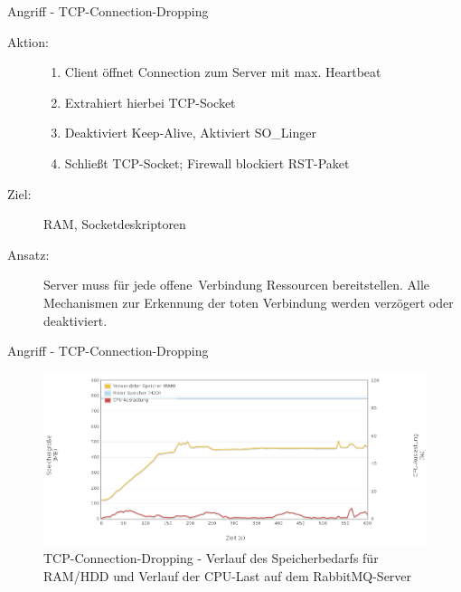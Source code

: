 \documentclass[10pt]{beamer}
\begin{document}
\begin{frame}[t]{Angriff - TCP-Connection-Dropping}
\begin{description}
	\item[Aktion:]
		\begin{enumerate}
			\item Client öffnet Connection zum Server mit max. Heartbeat
			\item Extrahiert hierbei TCP-Socket
			\item Deaktiviert Keep-Alive, Aktiviert SO\_Linger
			\item Schließt TCP-Socket; Firewall blockiert RST-Paket
		\end{enumerate} \smallskip
	\item[Ziel:] RAM, Socketdeskriptoren \smallskip
	\item[Ansatz:] Server muss für jede \glqq offene\grqq\ Verbindung Ressourcen bereitstellen. Alle Mechanismen zur Erkennung der toten Verbindung werden verzögert oder deaktiviert.
\end{description}
\end{frame}

\begin{frame}{Angriff - TCP-Connection-Dropping}
\begin{figure}[!htb]
	\centering
	\includegraphics[width=\textwidth]{img/tcpdrop/tcpdrop_server1.png}
	\caption{\centering TCP-Connection-Dropping - Verlauf des Speicherbedarfs für RAM/HDD und Verlauf der CPU-Last auf dem RabbitMQ-Server}
	\label{fig:tcpdrop-server1}
\end{figure}
\end{frame}
	
\end{document}
